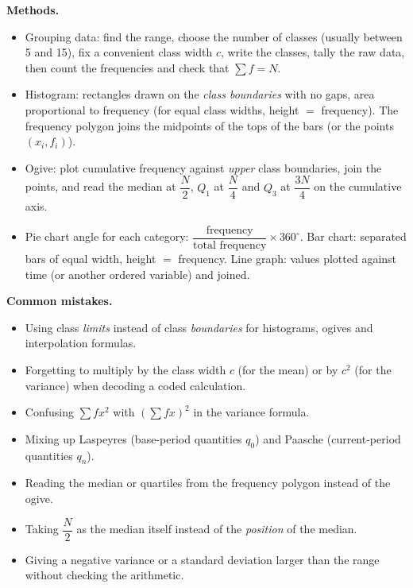 \documentclass[11pt]{article}
\newcommand{\cle}[1]{{\popxbold\color{popdark}#1}}
\begin{document}
\begin{bilan}
\textbf{Methods.}
\begin{itemize}
\item Grouping data: find the range, choose the number of classes (usually between 5 and 15), fix a convenient class width $c$, write the classes, \cle{tally} the raw data, then count the frequencies and check that $\sum f=N$.
\item Histogram: rectangles drawn on the \emph{class boundaries} with no gaps, area proportional to frequency (for equal class widths, height $=$ frequency). The \cle{frequency polygon} joins the midpoints of the tops of the bars (or the points $(x_i,f_i)$).
\item Ogive: plot cumulative frequency against \emph{upper} class boundaries, join the points, and read the median at $\dfrac{N}{2}$, $Q_1$ at $\dfrac{N}{4}$ and $Q_3$ at $\dfrac{3N}{4}$ on the cumulative axis.
\item Pie chart angle for each category: $\dfrac{\text{frequency}}{\text{total frequency}}\times 360^{\circ}$. Bar chart: separated bars of equal width, height $=$ frequency. Line graph: values plotted against time (or another ordered variable) and joined.
\end{itemize}

\textbf{Common mistakes.}
\begin{itemize}
\item Using class \emph{limits} instead of class \emph{boundaries} for histograms, ogives and interpolation formulas.
\item Forgetting to multiply by the class width $c$ (for the mean) or by $c^2$ (for the variance) when decoding a coded calculation.
\item Confusing $\sum f x^2$ with $\left(\sum f x\right)^2$ in the variance formula.
\item Mixing up Laspeyres (base-period quantities $q_0$) and Paasche (current-period quantities $q_n$).
\item Reading the median or quartiles from the frequency polygon instead of the ogive.
\item Taking $\dfrac{N}{2}$ as the median itself instead of the \emph{position} of the median.
\item Giving a negative variance or a standard deviation larger than the range without checking the arithmetic.
\end{itemize}


\end{bilan}
\end{document}
